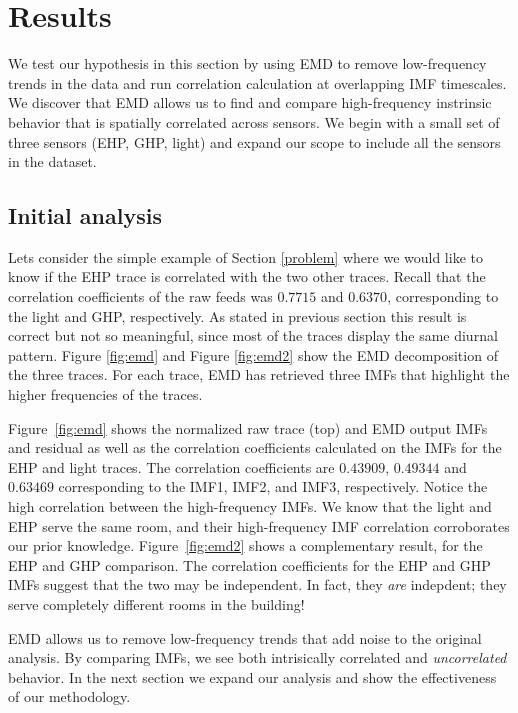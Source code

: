 \section{Results}

We test our hypothesis in this section by using EMD to remove low-frequency trends in the data
and run correlation calculation at overlapping IMF timescales.  We discover that EMD allows us
to find and compare high-frequency instrinsic behavior that is spatially correlated across
sensors.  We begin with a small set of three sensors (EHP, GHP, light) and expand our scope
to include all the sensors in the dataset.



\subsection{Initial analysis}
Lets consider the simple example of Section \ref{problem} where we would like to know if the EHP trace is correlated with the two other traces.
Recall that the correlation coefficients of the raw feeds was $0.7715$ and $0.6370$, corresponding to the light 
and GHP, respectively.
As stated in previous section this result is correct but not so meaningful, since most of the traces
display the same diurnal pattern.
Figure \ref{fig:emd} and Figure \ref{fig:emd2} show the EMD decomposition of the three traces.
For each trace, EMD has retrieved three IMFs that highlight the higher frequencies of the traces.

Figure~\ref{fig:emd} shows the normalized raw trace (top) and EMD output IMFs and residual as well as the 
correlation coefficients calculated on the IMFs for the EHP and
light traces.  The correlation coefficients are $0.43909$, $0.49344$ and $0.63469$ corresponding to the IMF1, 
IMF2, and IMF3, respectively.  Notice the high correlation between the high-frequency IMFs.
We know that the light and EHP serve the same room, and their high-frequency IMF correlation corroborates
our prior knowledge.
Figure~\ref{fig:emd2} shows a complementary result, for the EHP and GHP comparison.
The correlation coefficients for the EHP and GHP IMFs suggest that the two may be independent.  In fact, they
\emph{are} indepdent; they serve completely different rooms in the building!

EMD allows us to remove low-frequency trends that add noise to the original analysis.
By comparing IMFs, we see both intrisically correlated and \emph{uncorrelated} behavior.  In the next
section we expand our analysis and show the effectiveness of our methodology. 


